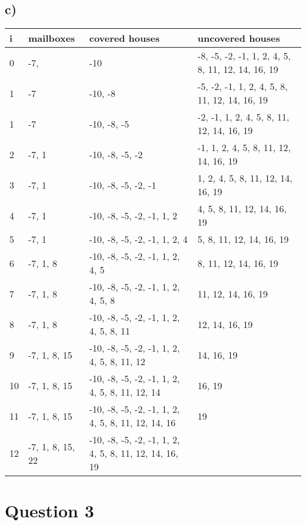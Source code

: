 \documentclass[12pt]{article}
\begin{document}
\subsection*{c)}
\begin{tabular}{|l|l|l|l|}
    \hline
    \textbf{i} & \textbf{mailboxes} & \textbf{covered houses} & \textbf{uncovered houses}\\
    \hline
    0 & -7, & -10 & -8, -5, -2, -1, 1, 2, 4, 5, 8, 11, 12, 14, 16, 19\\
    \hline
    1 & -7 & -10, -8 & -5, -2, -1, 1, 2, 4, 5, 8, 11, 12, 14, 16, 19\\
    \hline
    1 & -7 & -10, -8, -5 & -2, -1, 1, 2, 4, 5, 8, 11, 12, 14, 16, 19\\
    \hline
    2 & -7, 1 & -10, -8, -5, -2 & -1, 1, 2, 4, 5, 8, 11, 12, 14, 16, 19\\
    \hline
    3 & -7, 1 & -10, -8, -5, -2, -1 & 1, 2, 4, 5, 8, 11, 12, 14, 16, 19\\
    \hline
    4 & -7, 1 & -10, -8, -5, -2, -1, 1, 2 & 4, 5, 8, 11, 12, 14, 16, 19\\
    \hline
    5 & -7, 1 & -10, -8, -5, -2, -1, 1, 2, 4 & 5, 8, 11, 12, 14, 16, 19\\
    \hline
    6 & -7, 1, 8 & -10, -8, -5, -2, -1, 1, 2, 4, 5 & 8, 11, 12, 14, 16, 19\\
    \hline
    7 & -7, 1, 8 & -10, -8, -5, -2, -1, 1, 2, 4, 5, 8 & 11, 12, 14, 16, 19\\
    \hline
    8 & -7, 1, 8 & -10, -8, -5, -2, -1, 1, 2, 4, 5, 8, 11 & 12, 14, 16, 19\\
    \hline
    9 & -7, 1, 8, 15 & -10, -8, -5, -2, -1, 1, 2, 4, 5, 8, 11, 12 & 14, 16, 19\\
    \hline
    10 & -7, 1, 8, 15 & -10, -8, -5, -2, -1, 1, 2, 4, 5, 8, 11, 12, 14 & 16, 19\\
    \hline
    11 & -7, 1, 8, 15 & -10, -8, -5, -2, -1, 1, 2, 4, 5, 8, 11, 12, 14, 16 & 19\\
    \hline
    12 & -7, 1, 8, 15, 22 & -10, -8, -5, -2, -1, 1, 2, 4, 5, 8, 11, 12, 14, 16, 19 & \\
    \hline
\end{tabular}


\section*{Question 3}
\end{document}

